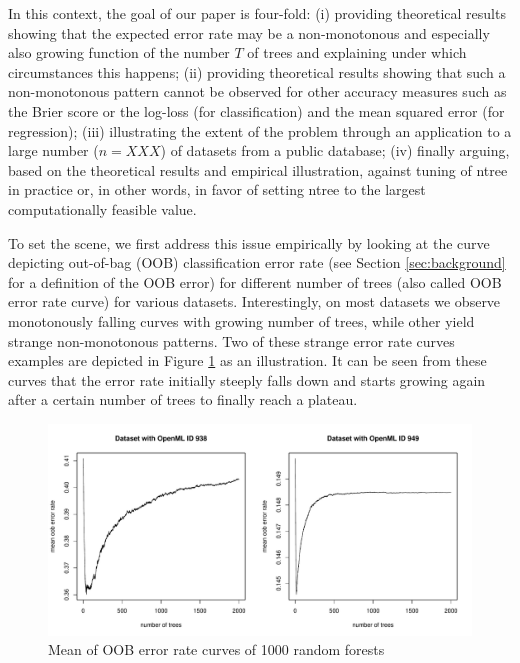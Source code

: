 \documentclass[paper=a4
               ,12pt
               ,DIV=12
               ,parskip=half
               ,titlepage=on
               ,headinclude 
               ,footinclude
               ,headsepline
               ,footsepline         %
               ,ilines 
               ]{scrartcl}
\begin{document}
In this context, the goal of our paper is four-fold: (i) providing theoretical results showing that the expected error rate may be a non-monotonous and especially also growing function of the number $T$ of trees and explaining under which circumstances 
this happens; (ii) providing theoretical results showing that such a non-monotonous pattern cannot be observed for other accuracy measures such as the Brier score or the log-loss (for classification) and the mean squared 
error (for regression); (iii) illustrating the extent of the problem through an application to a large number ($n=XXX$) of datasets from a public database; (iv) finally arguing, based on the theoretical results and empirical 
illustration, against tuning of ntree in practice or, in other words, in favor of setting ntree to the largest computationally feasible value.

To set the scene, we first address this issue empirically by looking at the curve depicting out-of-bag (OOB) classification error rate (see Section \ref{sec:background} for a definition of the OOB error) for different number 
of trees (also called OOB error rate curve) for various datasets. Interestingly, on most datasets we observe monotonously falling curves with growing number of trees, while other yield strange non-monotonous patterns. Two of these 
strange error rate curves examples are depicted in Figure \ref{fig:2examples} as an illustration. It can be seen from these curves that the error rate initially steeply falls down and  starts growing again after a certain number 
of trees to finally reach a plateau. 

\begin{figure}[!htb]
\begin{center}
  \includegraphics[width=\textwidth]{initial_example.pdf}
  \caption{Mean of OOB error rate curves of 1000 random forests}
   \label{fig:2examples}
\end{center}
\end{figure}
\end{document}
